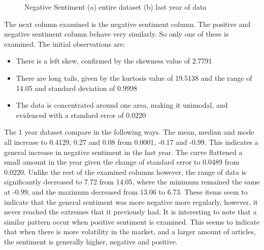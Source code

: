 \begin{figure}[h!]
    \centering
    \caption{Negative Sentiment (a) entire dataset (b) last year of data}
    \label{fig:negativeDesc}
\end{figure}

The next column examined is the negative sentiment column. The positive and negative sentiment column behave very similarly. So only one of these is examined. The initial observations are:
\begin{itemize}
    \item There is a left skew, confirmed by the skewness value of 2.7791
    \item There are long tails, given by the kurtosis value of 19.5138 and the range of 14.05 and standard deviation of 0.9998
    \item The data is concentrated around one area, making it unimodal, and evidenced with a standard error of 0.0220
\end{itemize}
The 1 year dataset compare in the following ways. The mean, median and mode all increase to 0.4129, 0.27 and 0.08 from 0.0001, -0.17 and -0.99. This indicates a general increase in negative sentiment in the last year. The curve flattened a small amount in the year given the change of standard error to 0.0489 from 0.0220. Unlike the rest of the examined columns however, the range of data is significantly decreased to 7.72 from 14.05, where the minimum remained the same at -0.99, and the maximum decreased from 13.06 to 6.73. These items seem to indicate that the general sentiment was more negative more regularly, however, it never reached the extremes that it previously had. It is interesting to note that a similar pattern occur when positive sentiment is examined. This seems to indicate that when there is more volatility in the market, and a larger amount of articles, the sentiment is generally higher, negative and positive.

